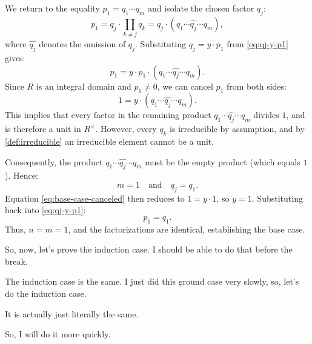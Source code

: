 \begin{proofWrapper}
\begin{content}
We return to the equality $p_1 = q_1 \cdots q_m$ and isolate the chosen factor $q_j$:
\begin{equation}\label{eq:base-case-isolation}
p_1 = q_j \cdot \prod_{k \neq j} q_k = q_j \cdot (q_1 \cdots \widehat{q_j} \cdots q_m),
\end{equation}
where $\widehat{q_j}$ denotes the omission of $q_j$. Substituting $q_j = y \cdot p_1$ from \eqref{eq:qj-y-p1} gives:
\begin{equation}\label{eq:base-case-subst}
p_1 = y \cdot p_1 \cdot (q_1 \cdots \widehat{q_j} \cdots q_m).
\end{equation}
Since $R$ is an integral domain and $p_1 \neq 0$, we can cancel $p_1$ from both sides:
\begin{equation}\label{eq:base-case-canceled}
1 = y \cdot (q_1 \cdots \widehat{q_j} \cdots q_m).
\end{equation}
This implies that every factor in the remaining product $q_1 \cdots \widehat{q_j} \cdots q_m$ divides $1$, and is therefore a unit in $R^\times$. However, every $q_k$ is irreducible by assumption, and by \cref{def:irreducible} an irreducible element cannot be a unit.

Consequently, the product $q_1 \cdots \widehat{q_j} \cdots q_m$ must be the empty product (which equals $1$). Hence:
\begin{equation}\label{eq:base-case-m-equals-1}
m = 1 \quad \text{and} \quad q_j = q_1.
\end{equation}
Equation \eqref{eq:base-case-canceled} then reduces to $1 = y \cdot 1$, so $y = 1$. Substituting back into \eqref{eq:qj-y-p1}:
\begin{equation}\label{eq:base-case-final}
p_1 = q_1.
\end{equation}
Thus, $n = m = 1$, and the factorizations are identical, establishing the base case.
\end{content}

\begin{speech}[00:41:44 - 00:43:15]
So, now, let's prove the induction case. I should be able to do that before the break. 

The induction case is the same. I just did this ground case very slowly, so, let's do the induction case.

It is actually just literally the same. 

So, I will do it more quickly.


\end{speech}
\end{proofWrapper}
